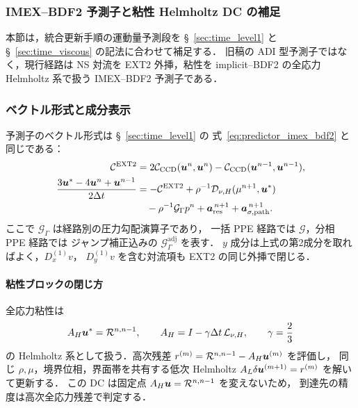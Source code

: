 
\subsubsection{IMEX--BDF2 予測子と粘性 Helmholtz DC の補足}
\label{app:predictor_imex_bdf2_detail}

本節は，統合更新手順の運動量予測段を
§~\ref{sec:time_level1} と §~\ref{sec:time_viscous} の記法に合わせて補足する．
旧稿の ADI 型予測子ではなく，現行経路は
NS 対流を EXT2 外挿，粘性を implicit--BDF2 の全応力 Helmholtz 系で扱う
IMEX--BDF2 予測子である．

\subsubsection{ベクトル形式と成分表示}
\label{app:predictor_components}

予測子のベクトル形式は §~\ref{sec:time_level1} の
式~\eqref{eq:predictor_imex_bdf2} と同じである：
\begin{align*}
  \mathcal{C}^{\mathrm{EXT2}}
    &= 2\mathcal{C}_{\mathrm{CCD}}(\bm{u}^n,\bm{u}^n)
       - \mathcal{C}_{\mathrm{CCD}}(\bm{u}^{n-1},\bm{u}^{n-1}), \\
  \frac{3\bm{u}^* - 4\bm{u}^n + \bm{u}^{n-1}}{2\Delta t}
    &= -\mathcal{C}^{\mathrm{EXT2}}
       + \rho^{-1}\mathcal{D}_{\nu,H}(\mu^{n+1},\bm{u}^*) \\
    &\quad - \rho^{-1}\mathcal{G}_{\Gamma}p^n
       + \bm{a}^{\,n+1}_{\mathrm{res}}
       + \bm{a}^{\,n+1}_{\sigma,\mathrm{path}} .
\end{align*}
ここで $\mathcal{G}_{\Gamma}$ は経路別の圧力勾配演算子であり，
一括 PPE 経路では $\mathcal{G}$，分相 PPE 経路では
ジャンプ補正込みの $\mathcal{G}^{\mathrm{adj}}_{\Gamma}$ を表す．
$y$ 成分は上式の第2成分を取ればよく，$D_x^{(1)}v$，
$D_y^{(1)}v$ を含む対流項も EXT2 の同じ外挿で閉じる．

\paragraph{粘性ブロックの閉じ方}
全応力粘性は
\[
  A_H\bm{u}^* = \mathcal{R}^{n,n-1},
  \qquad
  A_H = I-\gamma\Delta t\,\mathcal{L}_{\nu,H},
  \qquad \gamma=\frac{2}{3}
\]
の Helmholtz 系として扱う．高次残差
$r^{(m)}=\mathcal{R}^{n,n-1}-A_H\bm{u}^{(m)}$ を評価し，
同じ $\rho,\mu$，境界位相，界面帯を共有する低次 Helmholtz
$A_L\delta\bm{u}^{(m+1)}=r^{(m)}$ を解いて更新する．
この DC は固定点 $A_H\bm{u}=\mathcal{R}^{n,n-1}$ を変えないため，
到達先の精度は高次全応力残差で判定する．

